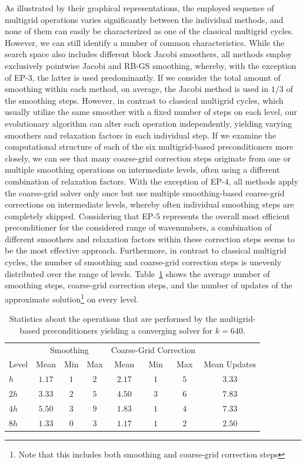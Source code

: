 As illustrated by their graphical representations, the employed sequence of multigrid operations varies significantly between the individual methods, and none of them can easily be characterized as one of the classical multigrid cycles.
However, we can still identify a number of common characteristics.
While the search space also includes different block Jacobi smoothers, all methods employ exclusively pointwise Jacobi and RB-GS smoothing, whereby, with the exception of EP-3, the latter is used predominantly.
If we consider the total amount of smoothing within each method, on average, the Jacobi method is used in $1/3$ of the smoothing steps.
However, in contrast to classical multigrid cycles, which usually utilize the same smoother with a fixed number of steps on each level, our evolutionary algorithm can alter each operation independently, yielding varying smoothers and relaxation factors in each individual step.
If we examine the computational structure of each of the six multigrid-based preconditioners more closely, we can see that many coarse-grid correction steps originate from one or multiple smoothing operations on intermediate levels, often using a different combination of relaxation factors.
With the exception of EP-4, all methods apply the coarse-grid solver only once but use multiple smoothing-based coarse-grid corrections on intermediate levels, whereby often individual smoothing steps are completely skipped.
Considering that EP-5 represents the overall most efficient preconditioner for the considered range of wavenumbers, a combination of different smoothers and relaxation factors within these correction steps seems to be the most effective approach.
Furthermore, in contrast to classical multigrid cycles, the number of smoothing and coarse-grid correction steps is unevenly distributed over the range of levels.
Table~\ref{table:operations-per-level} shows the average number of smoothing steps, coarse-grid correction steps, and the number of updates of the approximate solution\footnote{Note that this includes both smoothing and coarse-grid correction steps} on every level.
\begin{table}
	\caption[2D Helmholtz -- Operation statistics]{Statistics about the operations that are performed by the multigrid-based preconditioners yielding a converging solver for $k = 640$.}
	\label{table:operations-per-level}
	\centering
	\begin{tabular}{l c c c c c c c}
		\toprule
  		& \multicolumn{3}{c}{Smoothing} & \multicolumn{3}{c}{Coarse-Grid Correction} & \\
		\cmidrule(l){2-4} \cmidrule(l){5-7}
		Level & Mean & Min & Max & Mean & Min & Max & Mean Updates \\
        \midrule
        $h$ & $1.17$ & $1$ & $2$ & $2.17$ & $1$ & $5$ & $3.33$\\
        \midrule
        $2h$ & $3.33$ & $2$ & $5$ & $4.50$ & $3$ & $6$ & $7.83$ \\
        \midrule
        $4h$ & $5.50$ & $3$ & $9$ & $1.83$ & $1$ & $4$ & $7.33$ \\
        \midrule
        $8h$ & $1.33$ & $0$ & $3$ & $1.17$ & $1$ & $2$ & $2.50$ \\
		\bottomrule
	\end{tabular}
\end{table}
